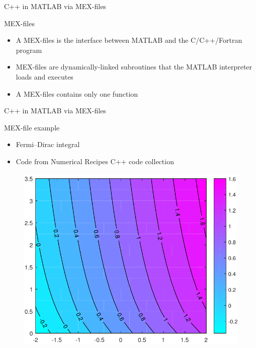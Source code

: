 \documentclass[compress]{beamer}
\begin{document}
\begin{frame}{C++ in MATLAB via MEX-files}

\begin{block}{MEX-files}
	\begin{itemize}
		\item A MEX-files is the interface between MATLAB and the C/C++/Fortran program
			 
		\item MEX-files are dynamically-linked subroutines that the MATLAB interpreter loads and executes
			 
		\item A MEX-files contains only one function
	\end{itemize}
\end{block}

\end{frame}
\begin{frame}{C++ in MATLAB via MEX-files}
\begin{exampleblock}{MEX-file example}
			\begin{itemize}
				\item Fermi--Dirac integral \\
				\item Code from Numerical Recipes C++ code collection
			\end{itemize}
\end{exampleblock}
	\begin{figure}
		\centering
		\includegraphics[width=0.5\linewidth]{figures/fermidirac_demo.pdf}
	\end{figure}	

\end{frame}
\end{document}
